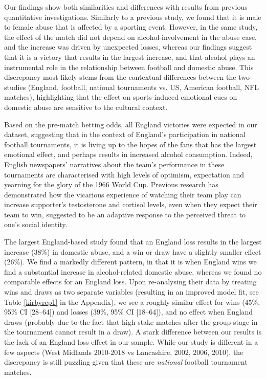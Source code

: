 \documentclass[12pt, letterpaper]{article}
\begin{document}
Our findings show both similarities and differences with results from previous quantitative investigations. Similarly to a previous study, we found that it is male to female abuse that is affected by a sporting event\autocite{Card2011}. However, in the same study, the effect of the match did not depend on alcohol-involvement in the abuse case, and the increase was driven by unexpected losses, whereas our findings suggest that it is a victory that results in the largest increase, and that alcohol plays an instrumental role in the relationship between football and domestic abuse. This discrepancy most likely stems from the contextual differences between the two studies (England, football, national tournaments vs. US, American football, NFL matches), highlighting that the effect on sports-induced emotional cues on domestic abuse are sensitive to the cultural context. 

Based on the pre-match betting odds, all England victories were expected in our dataset, suggesting that in the context of England's participation in national football tournaments, it is living up to the hopes of the fans that has the largest emotional effect, and perhaps results in increased alcohol consumption\autocite{Davies2018}. Indeed, English newspapers' narratives about the team's performance in these tournaments are characterised with high levels of optimism, expectation and yearning for the glory of the 1966 World Cup\autocite{Vincent2010}. Previous research has demonstrated how the vicarious experience of watching their team play can increase supporter's testosterone and cortisol levels, even when they expect their team to win, suggested to be an adaptive response to the perceived threat to one's social identity\autocite{VanderMeij2012}.


The largest England-based study found that an England loss results in the largest increase (38\%) in domestic abuse, and a win or draw have a slightly smaller effect (26\%)\autocite{Kirby2014}. We find a markedly different pattern, in that it is when England wins we find a substantial increase in alcohol-related domestic abuse, whereas we found no comparable effects for an England loss. Upon re-analysing their data by treating wins and draws as two separate variables (resulting in an improved model fit, see Table \ref{kirbyrep1} in the Appendix), we see a roughly similar effect for wins (45\%, 95\% CI [28--64]) and losses (39\%, 95\% CI [18--64]), and no effect when England draws (probably due to the fact that high-stake matches after the group-stage in the tournament cannot result in a draw). A stark difference between our results is the lack of an England loss effect in our sample. While our study is different in a few aspects (West Midlands 2010-2018 vs Lancashire, 2002, 2006, 2010), the discrepancy is still puzzling given that these are \textit{national} football tournament matches.
\end{document}
